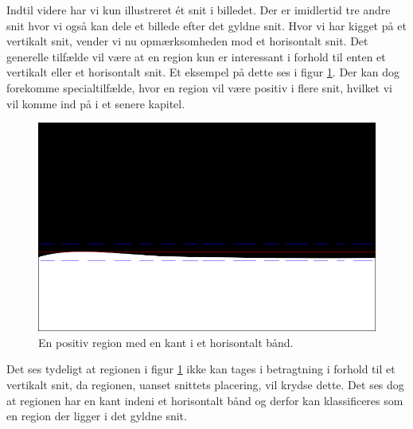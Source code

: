 {Indtil videre har vi kun illustreret ét snit i billedet.  Der er
imidlertid tre andre snit hvor vi også kan dele et billede efter det
gyldne snit.  Hvor vi har kigget på et vertikalt snit, vender vi nu
opmærksomheden mod et horisontalt snit.  Det generelle tilfælde vil være
at en region kun er interessant i forhold til enten et vertikalt eller
et horisontalt snit.  Et eksempel på dette ses i figur
\ref{pos_horiz_naiv_margin_1}.  Der kan dog forekomme specialtilfælde,
hvor en region vil være positiv i flere snit, hvilket vi vil komme ind
på i et senere kapitel.
\begin{figure}[H]
	\begin{center}
		\includegraphics[scale=\imgscale,angle=0]{afsnit/vores_implementation/billeder/naiv_algoritme/naiv_horiz_positiv_blob_1}
	\end{center}
	\caption[Positiv horisontal region]{En positiv region med en
	kant i et horisontalt bånd.}
	\label{pos_horiz_naiv_margin_1}
\end{figure}
Det ses tydeligt at regionen i figur \ref{pos_horiz_naiv_margin_1} ikke
kan tages i betragtning i forhold til et vertikalt snit, da regionen,
uanset snittets placering, vil krydse dette.  Det ses dog at regionen
har en kant indeni et horisontalt bånd og derfor kan klassificeres som
en region der ligger i det gyldne snit.

}
